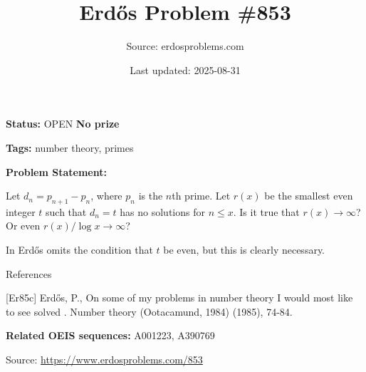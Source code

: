 \documentclass{article}
\title{Erd\H{o}s Problem \#853}
\date{Last updated: 2025-08-31}
\author{Source: erdosproblems.com}
\begin{document}
\maketitle

\noindent\textbf{Status:} OPEN \quad \textbf{No prize}

\noindent\textbf{Tags:} number theory, primes

\medskip

\noindent\textbf{Problem Statement:}

Let $d_n=p_{n+1}-p_n$, where $p_n$ is the $n$th prime. Let $r(x)$ be the smallest even integer $t$ such that $d_n=t$ has no solutions for $n\leq x$. Is it true that $r(x)\to \infty$? Or even $r(x)/\log x \to \infty$?




In \cite{Er85c} Erd\H{o}s omits the condition that $t$ be even, but this is clearly necessary.




References

[Er85c] Erd\H{o}s, P., On some of my problems in number theory I would most like to see solved . Number theory (Ootacamund, 1984) (1985), 74-84.

\noindent\textbf{Related OEIS sequences:} A001223, A390769


\bigskip
\noindent\small{Source: \url{https://www.erdosproblems.com/853}}
\end{document}
